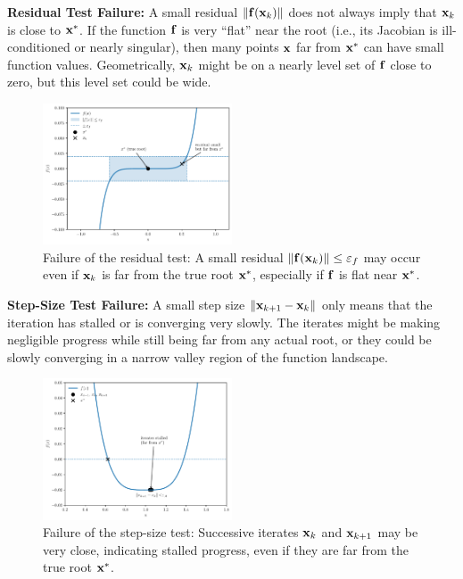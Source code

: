 \textbf{Residual Test Failure:}
A small residual $\|\mathbf{f}(\mathbf{x}_k)\|$ does not always imply that $\mathbf{x}_k$ is close to $\mathbf{x}^*$. If the function $\mathbf{f}$ is very ``flat'' near the root (i.e., its Jacobian is ill-conditioned or nearly singular), then many points $\mathbf{x}$ far from $\mathbf{x}^*$ can have small function values. Geometrically, $\mathbf{x}_k$ might be on a nearly level set of $\mathbf{f}$ close to zero, but this level set could be wide.

\begin{figure}[h]
    \centering
    \includegraphics[width=0.5\textwidth]{figs/nle/residual_test_failure.pdf}
    \caption{Failure of the residual test: A small residual $\|\mathbf{f}(\mathbf{x}_k)\| \le \varepsilon_f$ may occur even if $\mathbf{x}_k$ is far from the true root $\mathbf{x}^*$, especially if $\mathbf{f}$ is flat near $\mathbf{x}^*$.}
\end{figure}


\textbf{Step-Size Test Failure:}
A small step size $\|\mathbf{x}_{k+1} - \mathbf{x}_k\|$ only means that the iteration has stalled or is converging very slowly. The iterates might be making negligible progress while still being far from any actual root, or they could be slowly converging in a narrow valley region of the function landscape.

\begin{figure}[H]
    \centering
    \includegraphics[width=0.5\textwidth]{figs/nle/stepsize_test_failure.pdf}
    \caption{Failure of the step-size test: Successive iterates $\mathbf{x}_k$ and $\mathbf{x}_{k+1}$ may be very close, indicating stalled progress, even if they are far from the true root $\mathbf{x}^*$.}
\end{figure}

